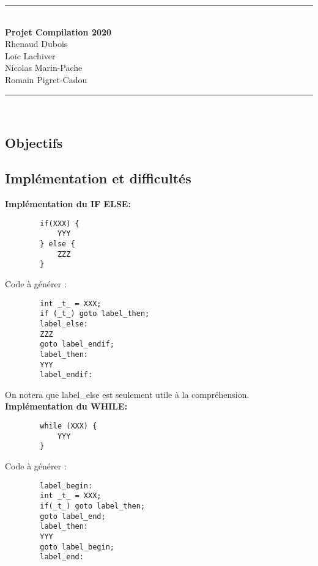 \documentclass[12pt, a4paper]{article}
\begin{document}


\begin{center}
    \rule{\linewidth}{0.5mm} \\
    \Large\textbf{Projet Compilation 2020\\}
    Rhenaud Dubois\\
    Loïc Lachiver\\
    Nicolas Marin-Pache\\
    Romain Pigret-Cadou
    
    \rule{\linewidth}{0.5mm} \\
\end{center}



\subsection*{Objectifs}


\subsection*{Implémentation et difficultés}
\textbf{Implémentation du IF ELSE:}

\begin{codequote}
    \begin{verbatim}
        if(XXX) {
            YYY
        } else {
            ZZZ
        }
    \end{verbatim}
\end{codequote}
Code à générer :\\
\begin{codequote}
    \begin{verbatim}
        int _t_ = XXX;
        if (_t_) goto label_then;
        label_else:
        ZZZ
        goto label_endif;
        label_then:
        YYY
        label_endif:
    \end{verbatim}
\end{codequote}
On notera que label\_else est seulement utile à la compréhension.\\

\textbf{Implémentation du WHILE:}
\begin{codequote}
    \begin{verbatim}
        while (XXX) {
            YYY
        }
    \end{verbatim}
\end{codequote}
Code à générer :\\
\begin{codequote}
    \begin{verbatim}
        label_begin:
        int _t_ = XXX;
        if(_t_) goto label_then;
        goto label_end;
        label_then:
        YYY
        goto label_begin;
        label_end:
    \end{verbatim}
\end{codequote}
\end{document}
